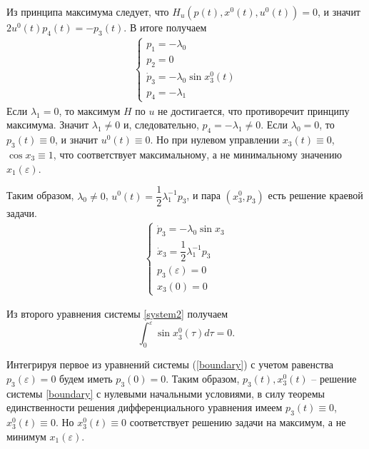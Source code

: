 \documentclass[../main.tex]{subfiles}
\begin{document}
Из принципа максимума следует, что
$H_u(p(t),x^0(t),u^0(t))=0$, и значит $2u^0(t)p_4(t)=-p_3(t)$.
В итоге получаем
\begin{equation*}
	\begin{array}{l}
		\left\{ {{{\begin{array}{l}
						{p_1 = -\lambda_0}\\
						{p_2 = 0}\\
						{{{\dot p}_3} = -\lambda_0 \sin x_3^0(t)}\\
						{p_4 =  -\lambda_1}
		\end{array}}}} \right.
	\end{array}
\end{equation*}
Если $ \lambda_1 = 0 $, то максимум $ H $ по $ u $ не достигается, что противоречит принципу максимума. Значит $ \lambda_1 \neq 0 $ и, следовательно, $p_4=-\lambda_1  \neq 0$. Если $ \lambda_0 = 0 $, то $ p_3(t) \equiv 0 $, и значит $ u^0(t) \equiv 0 $. Но при нулевом управлении $ x_3(t) \equiv 0 $, $ \cos x_3 \equiv 1 $, что соответствует максимальному, а не минимальному значению $ x_1(\varepsilon) $.


Таким образом, $ \lambda_0 \neq 0 $, $ u^0(t) = \dfrac{1}{2}\lambda_1^{-1}p_3 $, и пара $ (x_3^0,p_3) $ есть решение краевой задачи.
\begin{equation}\label{boundary}
	\begin{array}{l}
		\left\{ {{{\begin{array}{l}
						{{{\dot p}_3} = -\lambda_0 \sin x_3}\\
						{{{\dot x}_3} =  \dfrac{1}{2}\lambda_1^{-1}p_3}\\
						{p_3(\varepsilon) = 0} \\
						{x_3(0) = 0}
		\end{array}}}} \right.
	\end{array}
\end{equation}

Из второго уравнения системы \eqref{system2} получаем
\begin{equation*}
	\int_0^\varepsilon \sin x_3^0(\tau) d\tau = 0.
\end{equation*}

Интегрируя первое из уравнений системы (\ref{boundary}) с учетом равенства $ p_3(\varepsilon) = 0 $ будем иметь $ p_3(0) = 0 $. Таким образом, $ p_3(t), x_3^0(t) $  -- решение системы \eqref{boundary} с нулевыми начальными условиями, в силу теоремы единственности решения дифференциального уравнения имеем $ p_3(t) \equiv 0$, $ x_3^0(t) \equiv 0 $. Но $ x_3^0(t) \equiv 0 $ соответствует решению задачи на максимум, а не минимум $ x_1(\varepsilon) $.
\end{document}
